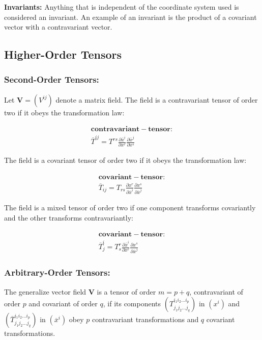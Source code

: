 \documentclass{article}
\begin{document}
\noindent
\textbf{Invariants:}
Anything that is independent of the coordinate system used is considered an invariant.  An example of an invariant is the product of a covariant vector with a contravariant vector.



\subsection{Higher-Order Tensors}

\subsubsection{Second-Order Tensors:}
Let $\mathbf{ V } = (V^{ij})$ denote a matrix field.  The field is a contravariant tensor of order two if it obeys the transformation law:

\begin{align}
	\mathbf{ contravariant-tensor: }\\
	\overline{ T }^{ij} = T^{rs} \frac{ \partial \overline{ x }^i }{ \partial x^r } \frac{ \partial \overline{ x }^j }{ \partial x^s }
\end{align}

The field is a covariant tensor of order two if it obeys the transformation law:

\begin{align}
	\mathbf{ covariant-tensor: }\\
	\overline{ T }_{ij} = T_{rs} \frac{ \partial x^r }{ \partial \overline{ x }^i } \frac{ \partial x^s }{ \partial \overline{ x }^j }
\end{align}

The field is a mixed tensor of order two if one component transforms covariantly and the other transforms contravariantly:

\begin{align}
	\mathbf{ covariant-tensor: }\\
	\overline{ T }^i_j = T^r_s \frac{ \partial \overline{ x }^i }{ \partial x^r } \frac{ \partial x^s }{ \partial \overline{ x }^j }
\end{align}

\subsubsection{Arbitrary-Order Tensors:}
The generalize vector field $\mathbf{ V }$ is a tensor of order $m = p + q$, contravariant of order $p$ and covariant of order $q$,
if its components $(T^{i_1 i_2 ... i_p}_{j_1 j_2 ... j_q})$ in $(x^i)$ and $(\overline{T}^{i_1 i_2 ... i_p}_{j_1 j_2 ... j_q})$
in $(\overline{ x }^i)$ obey $p$ contravariant transformations and $q$ covariant transformations.
\end{document}
